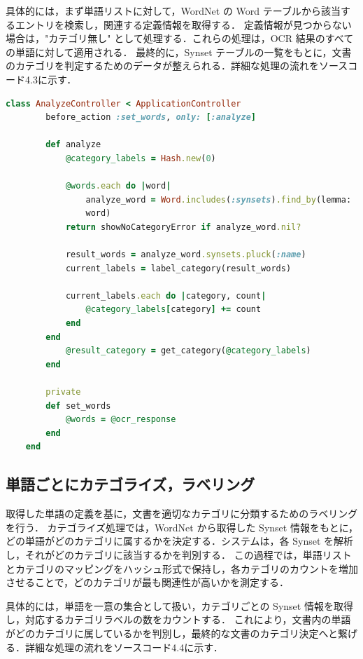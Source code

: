 具体的には，まず単語リストに対して，WordNet の Word テーブルから該当するエントリを検索し，関連する定義情報を取得する．
定義情報が見つからない場合は，"カテゴリ無し" として処理する．これらの処理は，OCR 結果のすべての単語に対して適用される．
最終的に，Synset テーブルの一覧をもとに，文書のカテゴリを判定するためのデータが整えられる．詳細な処理の流れをソースコード4.3に示す．

\begin{lstlisting}[language=Ruby, caption=ActiveRecord による WordNet との連携]
    class AnalyzeController < ApplicationController
        before_action :set_words, only: [:analyze]

        def analyze
            @category_labels = Hash.new(0)

            @words.each do |word|
                analyze_word = Word.includes(:synsets).find_by(lemma:
                word)
            return showNoCategoryError if analyze_word.nil?

            result_words = analyze_word.synsets.pluck(:name)
            current_labels = label_category(result_words)

            current_labels.each do |category, count|
                @category_labels[category] += count
            end
        end
            @result_category = get_category(@category_labels)
        end

        private
        def set_words
            @words = @ocr_response
        end
    end
\end{lstlisting}

\subsection{単語ごとにカテゴライズ，ラベリング}
\label{sebsec:app_categolize}

取得した単語の定義を基に，文書を適切なカテゴリに分類するためのラベリングを行う．
カテゴライズ処理では，WordNet から取得した Synset 情報をもとに，どの単語がどのカテゴリに属するかを決定する．システムは，各 Synset を解析し，それがどのカテゴリに該当するかを判別する．
この過程では，単語リストとカテゴリのマッピングをハッシュ形式で保持し，各カテゴリのカウントを増加させることで，どのカテゴリが最も関連性が高いかを測定する．

具体的には，単語を一意の集合として扱い，カテゴリごとの Synset 情報を取得し，対応するカテゴリラベルの数をカウントする．
これにより，文書内の単語がどのカテゴリに属しているかを判別し，最終的な文書のカテゴリ決定へと繋げる．詳細な処理の流れをソースコード4.4に示す．


